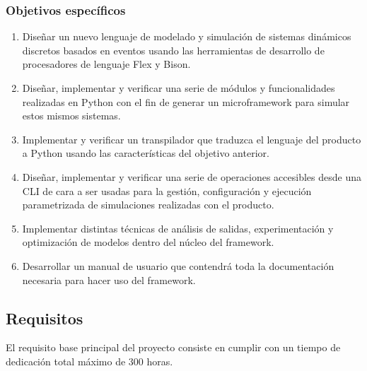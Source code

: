 \subsubsection{Objetivos específicos}
\begin{enumerate}
    \item Diseñar un nuevo lenguaje de modelado y simulación de sistemas
    dinámicos discretos basados en eventos usando las herramientas de desarrollo
    de procesadores de lenguaje Flex y Bison.
    \item Diseñar, implementar y verificar una serie de módulos y
    funcionalidades realizadas en Python con el fin de generar un microframework
    para simular estos mismos sistemas.
    \item Implementar y verificar un transpilador que traduzca el lenguaje del
    producto a Python usando las características del objetivo anterior.
    \item Diseñar, implementar y verificar una serie de operaciones accesibles
    desde una CLI de cara a ser usadas para la gestión, configuración y
    ejecución parametrizada de simulaciones realizadas con el producto. 
    \item Implementar distintas técnicas de análisis de salidas, experimentación
    y optimización de modelos dentro del núcleo del framework.
    \item Desarrollar un manual de usuario que contendrá toda la documentación
    necesaria para hacer uso del framework.
\end{enumerate}




\subsection{Requisitos}\label{subsec:requisitos}
El requisito base principal del proyecto consiste en cumplir con un tiempo de
dedicación total máximo de 300 horas.

